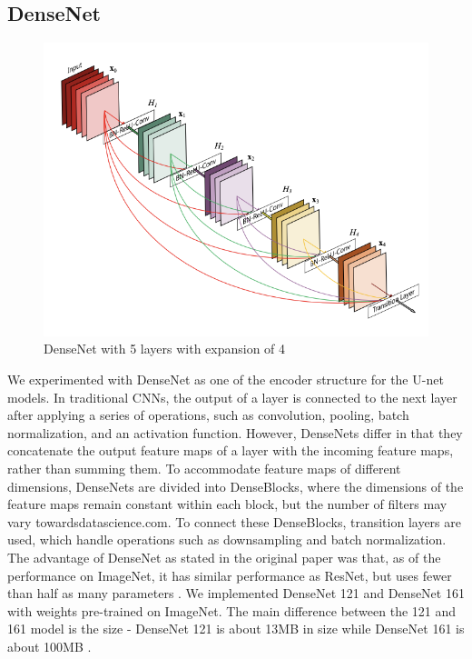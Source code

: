 \documentclass[10pt,twocolumn,letterpaper]{article}
\begin{document}
\subsection{DenseNet}
\begin{figure}[t]
  \centering
   \includegraphics[width=0.8\linewidth]{final-report/figures/densenet1.png}
   \caption{DenseNet with 5 layers with expansion of 4}
   \label{fig:densenet}
\end{figure}

We experimented with DenseNet as one of the encoder structure for the U-net models. In traditional CNNs, the output of a layer is connected to the next layer after applying a series of operations, such as convolution, pooling, batch normalization, and an activation function. However, DenseNets differ in that they concatenate the output feature maps of a layer with the incoming feature maps, rather than summing them. To accommodate feature maps of different dimensions, DenseNets are divided into DenseBlocks, where the dimensions of the feature maps remain constant within each block, but the number of filters may vary towardsdatascience.com. To connect these DenseBlocks, transition layers are used, which handle operations such as downsampling and batch normalization. The advantage of DenseNet as stated in the original paper was that, as of the performance on ImageNet, it has similar performance as ResNet, but uses fewer than half as many parameters \cite{Huang2016DenselyCC}. We implemented DenseNet 121 and DenseNet 161 with weights pre-trained on ImageNet. The main difference between the 121 and 161 model is the size - DenseNet 121 is about 13MB in size while DenseNet 161 is about 100MB \cite{OpenVINO_DenseNet}.
\end{document}
